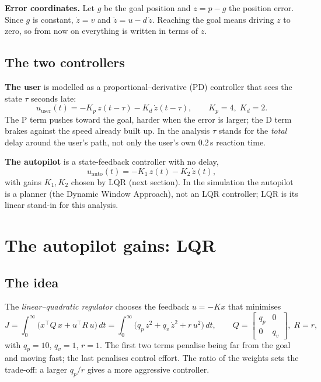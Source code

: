 \documentclass[11pt,a4paper]{article}
\theoremstyle{definition}
\begin{document}
\textbf{Error coordinates.} Let $g$ be the goal position and
$z = p - g$ the position error. Since $g$ is constant, $\dot z = v$ and
$\ddot z = u - d\,\dot z$. Reaching the goal means driving $z$ to zero,
so from now on everything is written in terms of $z$.

\subsection{The two controllers}

\textbf{The user} is modelled as a proportional--derivative (PD)
controller that sees the state $\tau$ seconds late:
\begin{equation}
u_{\mathrm{user}}(t) = -K_p\,z(t-\tau) - K_d\,\dot z(t-\tau),
\qquad K_p = 4,\; K_d = 2 .
\label{eq:user}
\end{equation}
The P term pushes toward the goal, harder when the error is larger; the
D term brakes against the speed already built up. In the analysis
$\tau$ stands for the \emph{total} delay around the user's path, not
only the user's own 0.2\,s reaction time.

\textbf{The autopilot} is a state-feedback controller with no delay,
\begin{equation}
u_{\mathrm{auto}}(t) = -K_1\,z(t) - K_2\,\dot z(t),
\label{eq:auto}
\end{equation}
with gains $K_1, K_2$ chosen by LQR (next section). In the simulation
the autopilot is a planner (the Dynamic Window Approach), not an LQR
controller; LQR is its linear stand-in for this analysis.

\section{The autopilot gains: LQR}
\label{sec:lqr}

\subsection{The idea}
The \emph{linear--quadratic regulator} chooses the feedback $u = -Kx$
that minimises
\begin{equation}
J = \int_0^\infty \bigl( x^{\!\top} Q\, x + u^{\!\top} R\, u \bigr)\,dt
  = \int_0^\infty \bigl( q_p\, z^2 + q_v\, \dot z^2 + r\, u^2 \bigr)\,dt ,
\qquad Q = \begin{bmatrix} q_p & 0\\ 0 & q_v\end{bmatrix},\; R = r,
\end{equation}
with $q_p = 10$, $q_v = 1$, $r = 1$. The first two terms penalise being
far from the goal and moving fast; the last penalises control effort.
The ratio of the weights sets the trade-off: a larger $q_p/r$ gives a
more aggressive controller.
\end{document}
